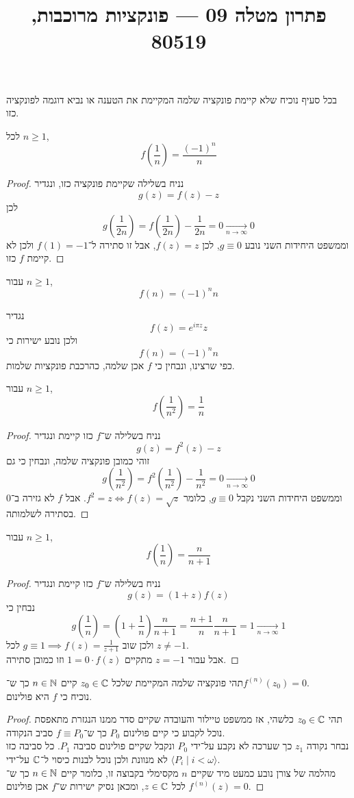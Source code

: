 
\title{פתרון מטלה 09 --- פונקציות מרוכבות, 80519}


\maketitle
\maketitleprint{}

\question{}
בכל סעיף נוכיח שלא קיימת פונקציה שלמה המקיימת את הטענה או נביא דוגמה לפונקציה כזו.

\subquestion{}
לכל $n \ge 1$,
\[
	f(\frac{1}{n}) = \frac{{(-1)}^n}{n}
\]
\begin{proof}
	נניח בשלילה שקיימת פונקציה כזו, ונגדיר
	\[
		g(z) = f(z) - z
	\]
	לכן
	\[
		g(\frac{1}{2n})
		= f(\frac{1}{2n}) - \frac{1}{2n}
		= 0
		\xrightarrow[n \to \infty]{} 0
	\]
	וממשפט היחידות השני נובע $g \equiv 0$, לכן $f(z) = z$, אבל זו סתירה ל־$f(1) = -1$ ולכן לא קיימת $f$ כזו.
\end{proof}

\subquestion{}
עבור $n \ge 1$,
\[
	f(n) = {(-1)}^n n
\]
\begin{solution}
	נגדיר
	\[
		f(z) = e^{i\pi z} z
	\]
	ולכן נובע ישירות כי
	\[
		f(n)
		= {(-1)}^n n
	\]
	כפי שרצינו, ונבחין כי $f$ אכן שלמה, כהרכבת פונקציות שלמות.
\end{solution}

\subquestion{}
עבור $n \ge 1$,
\[
	f(\frac{1}{n^2}) = \frac{1}{n}
\]
\begin{proof}
	נניח בשלילה ש־$f$ כזו קיימת ונגדיר
	\[
		g(z) = f^2(z) - z
	\]
	זוהי כמובן פונקציה שלמה, ונבחין כי גם
	\[
		g(\frac{1}{n^2})
		= f^2(\frac{1}{n^2}) - \frac{1}{n^2}
		= 0
		\xrightarrow[n \to \infty]{} 0
	\]
	וממשפט היחידות השני נקבל $g \equiv 0$, כלומר $f^2 = z \iff f(z) = \sqrt{z}$.
	אבל $f$ לא גזירה ב־$0$ בסתירה לשלמותה.
\end{proof}

\subquestion{}
עבור $n \ge 1$,
\[
	f(\frac{1}{n})
	= \frac{n}{n + 1}
\]
\begin{proof}
	נניח בשלילה ש־$f$ כזו קיימת ונגדיר
	\[
		g(z)
		= (1 + z)f(z)
	\]
	נבחין כי
	\[
		g(\frac{1}{n})
		= (1 + \frac{1}{n})\frac{n}{n + 1}
		= \frac{n + 1}{n}\frac{n}{n + 1}
		= 1
		\xrightarrow[n \to \infty]{} 1
	\]
	ולכן שוב $g \equiv 1 \implies f(z) = \frac{1}{z + 1}$ לכל $z \ne -1$. \\
	אבל עבור $z = -1$ מתקיים $1 = 0 \cdot f(z)$ וזו כמובן סתירה.
\end{proof}

\question{}
תהי פונקציה שלמה המקיימת שלכל $z_0 \in \mathbb{C}$ קיים $n \in \mathbb{N}$ כך ש־$f^{(n)}(z_0) = 0$. \\
נוכיח כי $f$ היא פולינום.
\begin{proof}
	תהי $z_0 \in \mathbb{C}$ כלשהי, אז ממשפט טיילור והעובדה שקיים סדר ממנו הנגזרת מתאפסת נוכל לקבוע כי קיים פולינום $P_0$ כך ש־$f \equiv P_0$ סביב הנקודה. \\
	נבחר נקודה $z_1$ כך שערכה לא נקבע על־ידי $P_0$ ונקבל שקיים פולינום סביבה $P_1$. כל סביבה כזו לא מנוונת ולכן נוכל לבנות כיסוי ל־$\mathbb{C}$ על־ידי $\langle P_i \mid i < \omega \rangle$. \\
	מהלמה של צורן נובע כמעט מיד שקיים $n$ מקסימלי בקבוצה זו, כלומר קיים $n \in \mathbb{N}$ כך ש־$f^{(n)}(z) = 0$ לכל $z \in \mathbb{C}$, ומכאן נסיק ישירות ש־$f$ אכן פולינום.
\end{proof}

